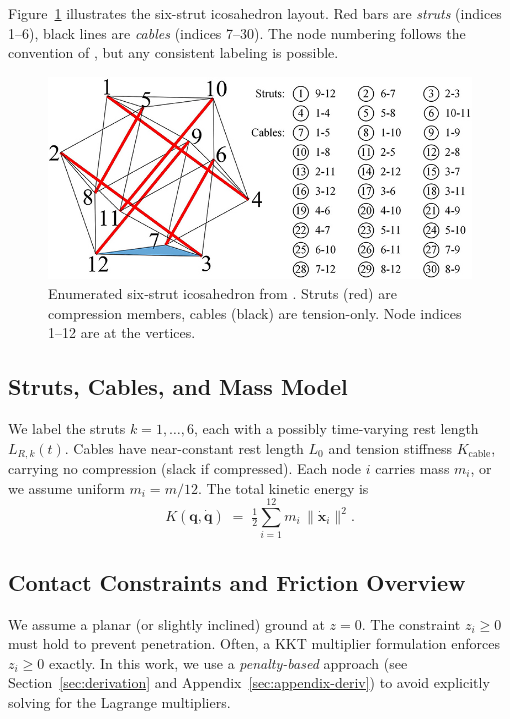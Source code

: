 \documentclass[12pt,letterpaper]{article}
\newcommand{\q}{\bm{q}}
\newcommand{\qd}{\dot{\bm{q}}}
\newcommand{\x}{\bm{x}}
\begin{document}
Figure~\ref{fig:icosahedron} illustrates the six-strut icosahedron layout. Red bars are \emph{struts} (indices 1–6), black lines are \emph{cables} (indices 7–30). The node numbering follows the convention of \cite{Cai2020}, but any consistent labeling is possible.

\begin{figure}[H]
    \centering
    \includegraphics[width=.9\linewidth]{icosahedron_diagram.jpg}
    \caption{Enumerated six‑strut icosahedron from \cite{Cai2020}.  
    Struts (red) are compression members, cables (black) are tension-only.  
    Node indices 1--12 are at the vertices.}
    \label{fig:icosahedron}
\end{figure}

\subsection{Struts, Cables, and Mass Model}
We label the struts $k=1,\dots,6$, each with a possibly time-varying rest length $L_{R,k}(t)$. Cables have near-constant rest length $L_0$ and tension stiffness $K_{\mathrm{cable}}$, carrying no compression (slack if compressed). Each node $i$ carries mass $m_i$, or we assume uniform $m_i=m/12$. The total kinetic energy is
\begin{equation}
    K(\q,\qd) \;=\;\tfrac12 \sum_{i=1}^{12} m_i\, \|\dot{\x}_i\|^2.
    \label{eq:Kdef-main}
\end{equation}

\subsection{Contact Constraints and Friction Overview}
We assume a planar (or slightly inclined) ground at $z=0$. The constraint $z_i\ge 0$ must hold to prevent penetration. Often, a KKT multiplier formulation enforces $z_i\ge 0$ exactly. In this work, we use a \emph{penalty-based} approach (see Section~\ref{sec:derivation} and Appendix~\ref{sec:appendix-deriv}) to avoid explicitly solving for the Lagrange multipliers. 
\end{document}
